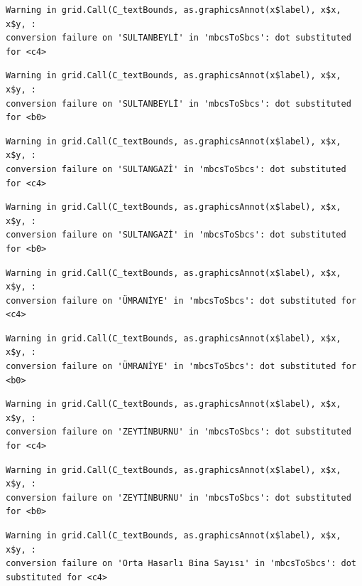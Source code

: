 \documentclass[
  11pt,
  a4paper,
  DIV=11,
  numbers=noendperiod]{scrartcl}
\begin{document}
\begin{verbatim}
Warning in grid.Call(C_textBounds, as.graphicsAnnot(x$label), x$x, x$y, :
conversion failure on 'SULTANBEYLİ' in 'mbcsToSbcs': dot substituted for <c4>
\end{verbatim}

\begin{verbatim}
Warning in grid.Call(C_textBounds, as.graphicsAnnot(x$label), x$x, x$y, :
conversion failure on 'SULTANBEYLİ' in 'mbcsToSbcs': dot substituted for <b0>
\end{verbatim}

\begin{verbatim}
Warning in grid.Call(C_textBounds, as.graphicsAnnot(x$label), x$x, x$y, :
conversion failure on 'SULTANGAZİ' in 'mbcsToSbcs': dot substituted for <c4>
\end{verbatim}

\begin{verbatim}
Warning in grid.Call(C_textBounds, as.graphicsAnnot(x$label), x$x, x$y, :
conversion failure on 'SULTANGAZİ' in 'mbcsToSbcs': dot substituted for <b0>
\end{verbatim}

\begin{verbatim}
Warning in grid.Call(C_textBounds, as.graphicsAnnot(x$label), x$x, x$y, :
conversion failure on 'ÜMRANİYE' in 'mbcsToSbcs': dot substituted for <c4>
\end{verbatim}

\begin{verbatim}
Warning in grid.Call(C_textBounds, as.graphicsAnnot(x$label), x$x, x$y, :
conversion failure on 'ÜMRANİYE' in 'mbcsToSbcs': dot substituted for <b0>
\end{verbatim}

\begin{verbatim}
Warning in grid.Call(C_textBounds, as.graphicsAnnot(x$label), x$x, x$y, :
conversion failure on 'ZEYTİNBURNU' in 'mbcsToSbcs': dot substituted for <c4>
\end{verbatim}

\begin{verbatim}
Warning in grid.Call(C_textBounds, as.graphicsAnnot(x$label), x$x, x$y, :
conversion failure on 'ZEYTİNBURNU' in 'mbcsToSbcs': dot substituted for <b0>
\end{verbatim}

\begin{verbatim}
Warning in grid.Call(C_textBounds, as.graphicsAnnot(x$label), x$x, x$y, :
conversion failure on 'Orta Hasarlı Bina Sayısı' in 'mbcsToSbcs': dot
substituted for <c4>
\end{verbatim}
\end{document}
